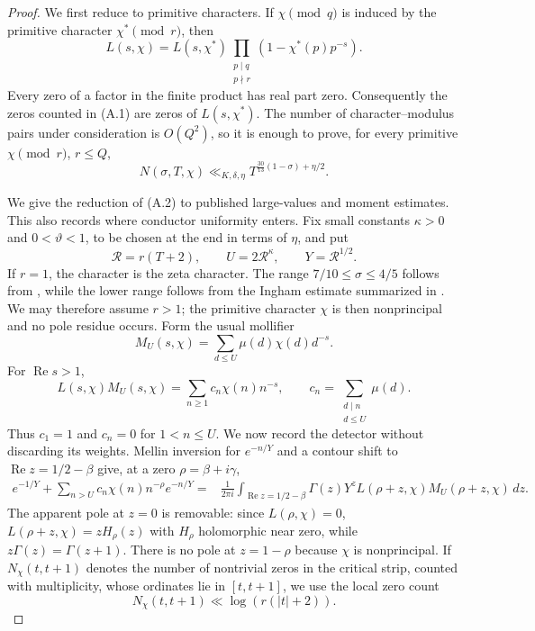 \begin{proof}
We first reduce to primitive characters.  If $\chi\pmod q$ is induced by the
primitive character $\chi^*\pmod r$, then
\[
 L(s,\chi)=L(s,\chi^*)
 \prod_{\substack{p\mid q\\p\nmid r}}
       (1-\chi^*(p)p^{-s}).
\]
Every zero of a factor in the finite product has real part zero.  Consequently
the zeros counted in (A.1) are zeros of $L(s,\chi^*)$.  The number of
character--modulus pairs under consideration is $O(Q^2)$, so it is enough to
prove, for every primitive $\chi\pmod r$, $r\le Q$,
\[
 N(\sigma,T,\chi)
 \ll_{K,\delta,\eta}
 T^{\frac{30}{13}(1-\sigma)+\eta/2}.
 \tag{A.2}
\]

We give the reduction of (A.2) to published large-values and moment estimates.
This also records where conductor uniformity enters. Fix small constants
$\kappa>0$ and $0<\vartheta<1$, to be chosen at the end in terms of $\eta$, and put
\[
 \mathcal R=r(T+2),\qquad U=2\mathcal R^\kappa,
 \qquad Y=\mathcal R^{1/2}.
\]
If $r=1$, the character is the zeta character.  The range
$7/10\le\sigma\le4/5$ follows from \cite[Theorem~1.2]{GuthMaynard2026},
while the lower range follows from the Ingham estimate summarized in
\cite[(1.4)]{GuthMaynard2026}.  We may therefore assume $r>1$;
the primitive character $\chi$ is then nonprincipal and no pole residue
occurs. Form the usual mollifier
\[
 M_U(s,\chi)=\sum_{d\le U}\mu(d)\chi(d)d^{-s}.
\]
For $\operatorname{Re} s>1$,
\[
 L(s,\chi)M_U(s,\chi)
 =\sum_{n\ge1}c_n\chi(n)n^{-s},
 \qquad c_n=\sum_{\substack{d\mid n\\d\le U}}\mu(d).
 \tag{A.3}
\]
Thus $c_1=1$ and $c_n=0$ for $1<n\le U$. We now record the detector without
discarding its weights. Mellin inversion for $e^{-n/Y}$ and a contour shift
to $\operatorname{Re} z=1/2-\beta$ give, at a zero
$\rho=\beta+i\gamma$,
\begin{align}
 e^{-1/Y}+\sum_{n>U}c_n\chi(n)n^{-\rho}e^{-n/Y}
  ={}&\frac1{2\pi i}\int_{\operatorname{Re} z=1/2-\beta}
       \Gamma(z)Y^zL(\rho+z,\chi)M_U(\rho+z,\chi)\,dz.         \tag{A.4}
\end{align}
The apparent pole at $z=0$ is removable: since $L(\rho,\chi)=0$,
$L(\rho+z,\chi)=zH_\rho(z)$ with $H_\rho$ holomorphic near zero, while
$z\Gamma(z)=\Gamma(z+1)$.  There is no pole at $z=1-\rho$ because $\chi$
is nonprincipal.  If
$N_\chi(t,t+1)$ denotes the number of nontrivial zeros in the critical strip,
counted with multiplicity, whose ordinates lie in $[t,t+1]$, we use the local
zero count
\[
 N_\chi(t,t+1)\ll\log(r(|t|+2)).                                \tag{A.5}
\]
\end{proof}
